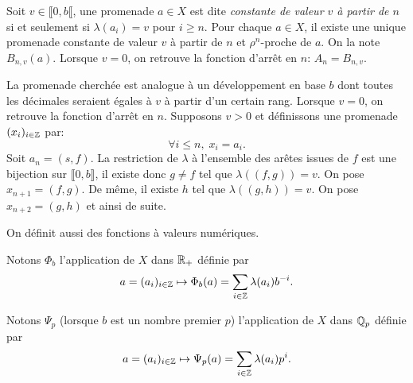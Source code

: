 \begin{defi}
 Soit $v\in \llbracket 0, b \llbracket$, une promenade $a\in X$ est dite \emph{constante de valeur $v$ à partir de $n$} si et seulement si $\lambda(a_i) =v$ pour $i\geq n$.\newline
 Pour chaque $a\in X$, il existe une unique promenade constante de valeur $v$ à partir de $n$ et $\rho^n$-proche de $a$. On la note $B_{n,v}(a)$.\newline
 Lorsque $v=0$, on retrouve la fonction d'arrêt en $n$: $A_n = B_{n,v}$.
\end{defi}
\begin{demo}
La promenade cherchée est analogue à un développement en base $b$ dont toutes les \og décimales\fg{} seraient égales à $v$ à partir d'un certain rang. Lorsque $v=0$, on retrouve la fonction d'arrêt en $n$. Supposons $v>0$ et définissons une promenade $(x_i)_{i\in \mathbb{Z}}$ par:
\begin{displaymath}
 \forall i \leq n, \; x_i = a_i.
\end{displaymath}
Soit $a_n = (s,f)$. La restriction de $\lambda$ à l'ensemble des arêtes issues de $f$ est une bijection sur $\llbracket 0 , b \rrbracket$, il existe donc $g \neq f$ tel que $\lambda((f,g))=v$. On pose $x_{n+1} = (f,g)$.\newline
De même, il existe $h$ tel que $\lambda((g,h))=v$. On pose $x_{n+2} = (g,h)$ et ainsi de suite.
\end{demo}
\noindent On définit aussi des fonctions à valeurs numériques.
\begin{defin} \label{Def:PromFoncNum}
Notons $\Phi_b$ l'application de $X$ dans $\mathbb{R}_+$ définie par
\begin{displaymath}
  a =  (a_i)_{i\in \mathbb{Z}} \mapsto \Phi_b(a) = \sum_{i \in \mathbb{Z}} \lambda(a_i) b^{-i}.
\end{displaymath}

Notons $\Psi_p$ (lorsque $b$ est un nombre premier $p$) l'application de $X$ dans $\mathbb{Q}_p$ définie par
\begin{displaymath}
 a =  (a_i)_{i\in \mathbb{Z}} \mapsto \Psi_p(a) = \sum_{i \in \mathbb{Z}} \lambda(a_i) p^{i}.
\end{displaymath}
\end{defin}

